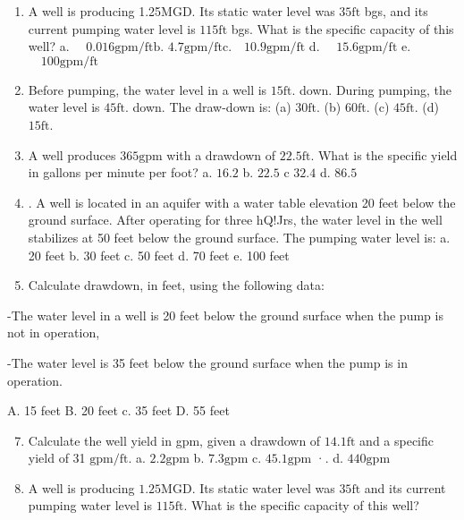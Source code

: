 \documentclass[10pt]{article}
\begin{document}
\begin{enumerate}
\begin{enumerate}
\begin{enumerate}
  \item A well is producing 1.25MGD. Its static water level was $35 \mathrm{ft}$ bgs, and its current pumping water level is $115 \mathrm{ft}$ bgs. What is the specific capacity of this well? a. $\quad 0.016 \mathrm{gpm} / \mathrm{ft} \mathrm{b}$. $4.7 \mathrm{gpm} / \mathrm{ft} \mathrm{c.} \quad 10.9 \mathrm{gpm} / \mathrm{ft}$ d. $\quad 15.6 \mathrm{gpm} / \mathrm{ft}$ e. $\quad 100 \mathrm{gpm} / \mathrm{ft}$

  \item Before pumping, the water level in a well is $15 \mathrm{ft}$. down. During pumping, the water level is $45 \mathrm{ft}$. down. The draw-down is:
(a) $30 \mathrm{ft}$.
(b) $60 \mathrm{ft}$.
(c) $45 \mathrm{ft}$.
(d) $15 \mathrm{ft}$.

  \item A well produces $365 \mathrm{gpm}$ with a drawdown of $22.5 \mathrm{ft}$. What is the specific yield in gallons per minute per foot?
a. $16.2$
b. $22.5$
c $32.4$
d. $86.5$

  \item . A well is located in an aquifer with a water table elevation 20 feet below the ground surface. After operating for three hQ!Jrs, the water level in the well stabilizes at 50 feet below the ground surface. The pumping water level is:
a. 20 feet
b. 30 feet
c. 50 feet
d. 70 feet
e. 100 feet

  \item Calculate drawdown, in feet, using the following data:

\end{enumerate}

-The water level in a well is 20 feet below the ground surface when the pump is not in operation,

-The water level is 35 feet below the ground surface when the pump is in operation.

A. 15 feet
B. 20 feet
c. 35 feet
D. 55 feet

\begin{enumerate}
  \setcounter{enumi}{6}
  \item Calculate the well yield in gpm, given a drawdown of $14.1 \mathrm{ft}$ and a specific yield of 31 $\mathrm{gpm} / \mathrm{ft}$.
a. $2.2 \mathrm{gpm}$
b. $7.3 \mathrm{gpm}$
c. $45.1 \mathrm{gpm}$
·. d. $440 \mathrm{gpm}$

  \item A well is producing $1.25 \mathrm{MGD}$. Its static water level was $35 \mathrm{ft}$ and its current pumping water level is $115 \mathrm{ft}$. What is the specific capacity of this well?


\end{enumerate}
\end{enumerate}
\end{enumerate}
\end{document}
